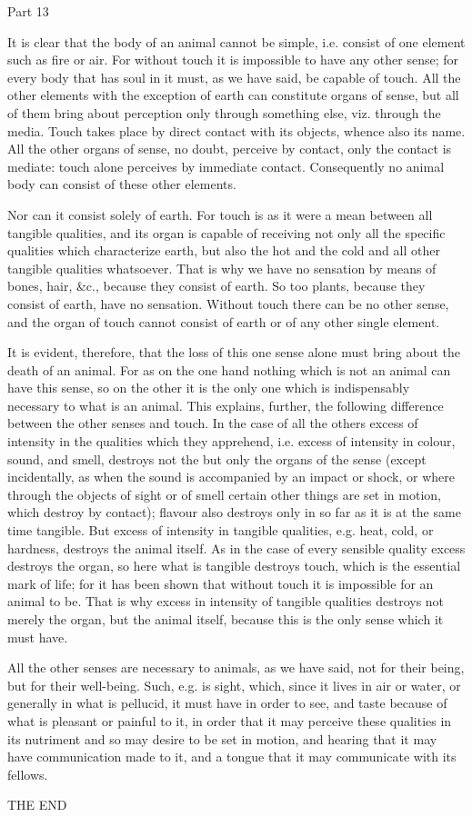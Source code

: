 Part 13

It is clear that the body of an animal cannot be simple, i.e. consist
of one element such as fire or air. For without touch it is impossible
to have any other sense; for every body that has soul in it must,
as we have said, be capable of touch. All the other elements with
the exception of earth can constitute organs of sense, but all of
them bring about perception only through something else, viz. through
the media. Touch takes place by direct contact with its objects, whence
also its name. All the other organs of sense, no doubt, perceive by
contact, only the contact is mediate: touch alone perceives by immediate
contact. Consequently no animal body can consist of these other elements.

Nor can it consist solely of earth. For touch is as it were a mean
between all tangible qualities, and its organ is capable of receiving
not only all the specific qualities which characterize earth, but
also the hot and the cold and all other tangible qualities whatsoever.
That is why we have no sensation by means of bones, hair, &c., because
they consist of earth. So too plants, because they consist of earth,
have no sensation. Without touch there can be no other sense, and
the organ of touch cannot consist of earth or of any other single
element. 

It is evident, therefore, that the loss of this one sense alone must
bring about the death of an animal. For as on the one hand nothing
which is not an animal can have this sense, so on the other it is
the only one which is indispensably necessary to what is an animal.
This explains, further, the following difference between the other
senses and touch. In the case of all the others excess of intensity
in the qualities which they apprehend, i.e. excess of intensity in
colour, sound, and smell, destroys not the but only the organs of
the sense (except incidentally, as when the sound is accompanied by
an impact or shock, or where through the objects of sight or of smell
certain other things are set in motion, which destroy by contact);
flavour also destroys only in so far as it is at the same time tangible.
But excess of intensity in tangible qualities, e.g. heat, cold, or
hardness, destroys the animal itself. As in the case of every sensible
quality excess destroys the organ, so here what is tangible destroys
touch, which is the essential mark of life; for it has been shown
that without touch it is impossible for an animal to be. That is why
excess in intensity of tangible qualities destroys not merely the
organ, but the animal itself, because this is the only sense which
it must have. 

All the other senses are necessary to animals, as we have said, not
for their being, but for their well-being. Such, e.g. is sight, which,
since it lives in air or water, or generally in what is pellucid,
it must have in order to see, and taste because of what is pleasant
or painful to it, in order that it may perceive these qualities in
its nutriment and so may desire to be set in motion, and hearing that
it may have communication made to it, and a tongue that it may communicate
with its fellows. 

THE END

